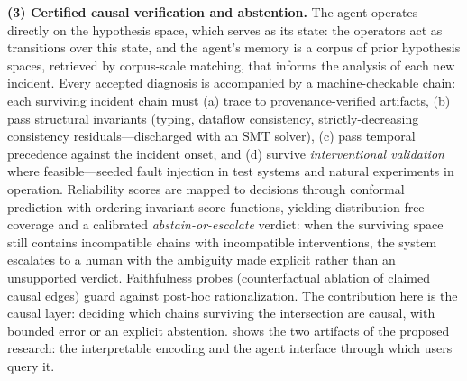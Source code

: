 \documentclass[12pt]{article}
\begin{document}
\textbf{(3) Certified causal verification and abstention.} The agent operates directly on the hypothesis space, which serves as its state: the operators act as transitions over this state, and the agent's memory is a corpus of prior hypothesis spaces, retrieved by corpus-scale matching, that informs the analysis of each new incident. Every accepted diagnosis is accompanied by a machine-checkable chain: each surviving incident chain must (a) trace to provenance-verified artifacts, (b) pass structural invariants (typing, dataflow consistency, strictly-decreasing consistency residuals---discharged with an SMT solver), (c) pass temporal precedence against the incident onset, and (d) survive \emph{interventional validation} where feasible---seeded fault injection in test systems and natural experiments in operation. Reliability scores are mapped to decisions through conformal prediction with ordering-invariant score functions, yielding distribution-free coverage and a calibrated \emph{abstain-or-escalate} verdict: when the surviving space still contains incompatible chains with incompatible interventions, the system escalates to a human with the ambiguity made explicit rather than an unsupported verdict. Faithfulness probes (counterfactual ablation of claimed causal edges) guard against post-hoc rationalization. The contribution here is the causal layer: deciding which chains surviving the intersection are causal, with bounded error or an explicit abstention.  shows the two artifacts of the proposed research: the interpretable encoding and the agent interface through which users query it.
\end{document}
